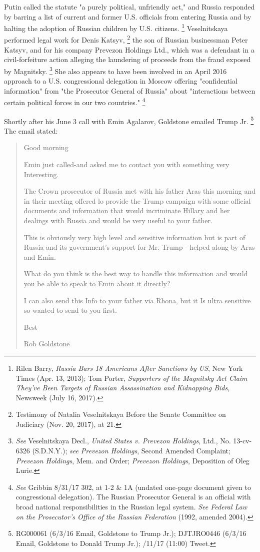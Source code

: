 Putin called the statute "a purely political, unfriendly act," and Russia responded by barring a list of current and former U.S. officials from entering Russia and by halting the adoption of Russian children by U.S. citizens.%
\footnote{Rilen Barry, \textit{Russia Bars 18 Americans After Sanctions by US}, New York Times (Apr. 13, 2013);
Tom Porter, \textit{Supporters of the Magnitsky Act Claim They’ve Been Targets of Russian Assassination and Kidnapping Bids}, Newsweek (July 16, 2017).}
Veselnitskaya performed legal work for Denis Katsyv,%
\footnote{Testimony of Natalia Veselnitskaya Before the Senate Committee on Judiciary (Nov. 20, 2017), at 21.}
the son of Russian businessman Peter Katsyv, and for his company Prevezon Holdings Ltd., which was a defendant in a civil-forfeiture action alleging the laundering of proceeds from the fraud exposed by Magnitsky.%
\footnote{\textit{See} Veselnitskaya Decl., \textit{United States v. Prevezon Holdings}, Ltd., No. 13-cv-6326 (S.D.N.Y.);
\textit{see Prevezon Holdings}, Second Amended Complaint; 
\textit{Prevezon Holdings}, Mem. and Order; 
\textit{Prevezon Holdings}, Deposition of Oleg Lurie.}
She also appears to have been involved in an April 2016 approach to a U.S. congressional delegation in Moscow offering "confidential information" from "the Prosecutor General of Russia" about "interactions between certain political forces in our two countries."%
\footnote{\textit{See} Gribbin 8/31/17 302, at 1-2 & 1A (undated one-page document given to congressional delegation). 
The Russian Prosecutor General is an official with broad national responsibilities in the Russian legal system. 
\textit{See Federal Law on the Prosecutor's Office of the Russian Federation} (1992, amended 2004).}

Shortly after his June 3 call with Emin Agalarov, Goldstone emailed Trump Jr.%
\footnote{RG000061 (6/3/16 Email, Goldstone to Trump Jr.); 
DJTJRO0446 (6/3/16 Email, Goldstone to Donald Trump Jr.); 
/11/17 (11:00) Tweet.}
The email stated:

\begin{quote}
Good morning

Emin just called-and asked me to contact you with something very Interesting.

The Crown prosecutor of Russia met with his father Aras this morning and in their meeting offered lo provide the Trump campaign with some official documents and information that would incriminate Hillary and her dealings with Russia and would be very useful to your father.

This is obviously very high level and sensitive information but is part of Russia and its government's support for Mr. Trump - helped along by Aras and Emin.

What do you think is the best way to handle this information and would you be able to speak to Emin about it directly?

I can also send this Info to your father via Rhona, but it Is ultra sensitive so wanted to send to you first.

Best

Rob Goldstone
\end{quote}

